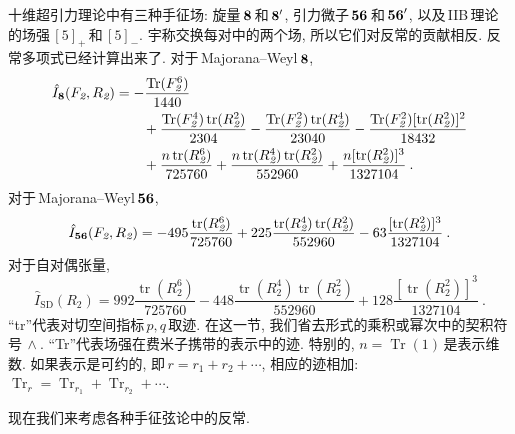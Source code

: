 十维超引力理论中有三种手征场: 旋量$\,\bf{8}\,$和$\,\bf{8}^{\prime}$, 引力微子$\,\bf{56}\,$和$\,\bf{56}^{\prime}$, 以及\,IIB\,理论的场强$\,[5]_{+}\,$和$\,[5]_{-}$. 宇称交换每对中的两个场, 所以它们对反常的贡献相反. 反常多项式已经计算出来了. 对于\,Majorana--Weyl\,$\bf{8}$,
\begin{align}
    \hat{I}_{\bf{8}}(F_{\textit{2}},R_{\textit{2}}) &= -\frac{\operatorname{Tr}(F_{\textit{2}}^{6})}{1440} \nonumber\\
    &\qquad +\frac{\operatorname{Tr}(F_{\textit{2}}^{4})\operatorname{tr}(R_{\textit{2}}^{2})}{2304} - \frac{\operatorname{Tr}(F_{\textit{2}}^{2})\operatorname{tr}(R_{\textit{2}}^{4})}{23040} -\frac{\operatorname{Tr}(F_{\textit{2}}^{2})[\operatorname{tr}(R_{\textit{2}}^{2})]^{2}}{18432}\nonumber \\
    &\qquad +\frac{n\operatorname{tr}(R_{\textit{2}}^{6})}{725760} +\frac{n\operatorname{tr}(R_{\textit{2}}^{4})\operatorname{tr}(R_{\textit{2}}^{2})}{552960}+\frac{n[\operatorname{tr}(R_{\textit{2}}^{2})]^{3}}{1327104}  \:.\label{12.2.11}
\end{align}
对于\,Majorana--Weyl\,$\bf{56}$,
\begin{equation}
    \hat{I}_{\bf{56}}(F_{\textit{2}},R_{\textit{2}}) =-495\frac{\operatorname{tr}(R_{\textit{2}}^{6})}{725760}+225\frac{\operatorname{tr}(R_{\textit{2}}^{4})\operatorname{tr}(R_{\textit{2}}^{2})}{552960}-63\frac{[\operatorname{tr}(R_{\textit{2}}^{2})]^{3}}{1327104} \:.
    \label{12.2.12}
\end{equation}
对于自对偶张量,
\begin{equation}
    \hat{I}_{\text{SD}}(R_{\textit{2}}) =992\frac{\operatorname{tr}(R_{\textit{2}}^{6})}{725760}-448\frac{\operatorname{tr}(R_{\textit{2}}^{4})\operatorname{tr}(R_{\textit{2}}^{2})}{552960}+128\frac{[\operatorname{tr}(R_{\textit{2}}^{2})]^{3}}{1327104} \:. \label{12.2.13}
\end{equation}
``tr''代表对切空间指标$\,p,q\,$取迹. 在这一节, 我们省去形式的乘积或幂次中的契积符号$\,\wedge$. ``Tr''代表场强在费米子携带的表示中的迹. 特别的, $n=\operatorname{Tr}(1)$\,是表示维数. 如果表示是可约的, 即$\,r=r_{1}+r_{2}+\cdots$, 相应的迹相加: $\operatorname{Tr}_{r}=\operatorname{Tr}_{r_{1}}+\operatorname{Tr}_{r_{2}}+\cdots$.

现在我们来考虑各种手征弦论中的反常.
